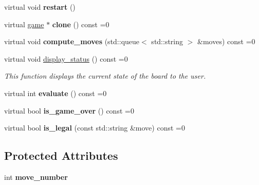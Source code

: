 \begin{DoxyCompactItemize}
\item 
\mbox{\label{classmain__savitch__14_1_1game_ad521a7d78e7c163a0bc28b709f0d45fd}} 
virtual void {\bfseries restart} ()
\item 
\mbox{\label{classmain__savitch__14_1_1game_a7b663057f59210dd52738facfc40d959}} 
virtual \mbox{\hyperlink{classmain__savitch__14_1_1game}{game}} $\ast$ {\bfseries clone} () const =0
\item 
\mbox{\label{classmain__savitch__14_1_1game_a2c0c049f5861026d0f639b5837889b7a}} 
virtual void {\bfseries compute\+\_\+moves} (std\+::queue$<$ std\+::string $>$ \&moves) const =0
\item 
virtual void \mbox{\hyperlink{classmain__savitch__14_1_1game_ac8205178922c49bab2865187e834b726}{display\+\_\+status}} () const =0
\begin{DoxyCompactList}\small\item\em This function displays the current state of the board to the user. \end{DoxyCompactList}\item 
\mbox{\label{classmain__savitch__14_1_1game_a9b9c8c5e9aa57c9a430f20b87cb047aa}} 
virtual int {\bfseries evaluate} () const =0
\item 
\mbox{\label{classmain__savitch__14_1_1game_a49eed20648918b03fd3e2cf78987b3d1}} 
virtual bool {\bfseries is\+\_\+game\+\_\+over} () const =0
\item 
\mbox{\label{classmain__savitch__14_1_1game_ad38351422ca1ee3ae58440c1c6b36b30}} 
virtual bool {\bfseries is\+\_\+legal} (const std\+::string \&move) const =0
\end{DoxyCompactItemize}
\subsection*{Protected Attributes}
\begin{DoxyCompactItemize}
\item 
\mbox{\label{classmain__savitch__14_1_1game_ac4c296f4370d8e5bb5ea74b638fb827d}} 
int {\bfseries move\+\_\+number}
\end{DoxyCompactItemize}


